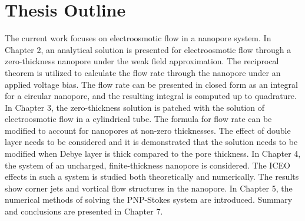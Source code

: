 \section{Thesis Outline}\label{thesisoutline}
The current work focuses on electroosmotic flow in a nanopore system. In Chapter 2, an analytical solution is presented for electroosmotic flow through a zero-thickness nanopore under the weak field approximation. The reciprocal theorem is utilized to calculate the flow rate through the nanopore under an applied voltage bias. The flow rate can be presented in closed form as an integral for a circular nanopore, and the resulting integral is computed up to quadrature. In Chapter 3, the zero-thickness solution is patched with the solution of electroosmotic flow in a cylindrical tube. The formula for flow rate can be modified to account for nanopores at non-zero thicknesses. The effect of double layer needs to be considered and it is demonstrated that the solution needs to be modified when Debye layer is thick compared to the pore thickness. In Chapter 4, the system of an uncharged, finite-thickness nanopore is considered. The ICEO effects in such a system is studied both theoretically and numerically. The results show corner jets and vortical flow structures in the nanopore. In Chapter 5, the numerical methods of solving the PNP-Stokes system are introduced. Summary and conclusions are presented in Chapter 7. 